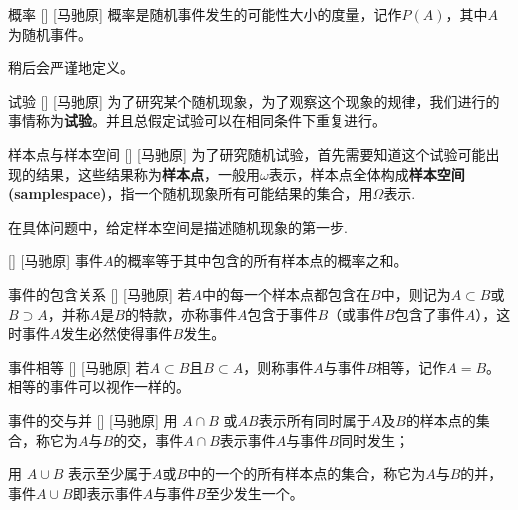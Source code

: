\documentclass[UTF8]{ctexart}
\begin{document}
        \begin{dfn}
            []
            {概率}
            []
            [马驰原]
            概率是随机事件发生的可能性大小的度量，记作$P(A)$，其中$A$为随机事件。
        \end{dfn}

        稍后会严谨地定义。

        \begin{dfn}
            []
            {试验}
            []
            [马驰原]
            为了研究某个随机现象，为了观察这个现象的规律，我们进行的事情称为\textbf{试验}。并且总假定试验可以在相同条件下重复进行。
        \end{dfn}

        \begin{dfn}
            []
            {样本点与样本空间}
            []
            [马驰原]
            为了研究随机试验，首先需要知道这个试验可能出现的结果，这些结果称为\textbf{样本点}，一般用$\omega$表示，样本点全体构成\textbf{样本空间(samplespace)}，指一个随机现象所有可能结果的集合，用$\Omega$表示.
        \end{dfn}

        在具体问题中，给定样本空间是描述随机现象的第一步.

        \begin{ppt}
            []
            {}
            []
            [马驰原]
            事件$A$的概率等于其中包含的所有样本点的概率之和。
        \end{ppt}

        \begin{dfn}
            []
            {事件的包含关系}
            []
            [马驰原]
            若$A$中的每一个样本点都包含在$B$中，则记为$A\subset B$或$B\supset  A$，并称$A$是$B$的特款，亦称事件$A$包含于事件$B$（或事件$B$包含了事件$A$），这时事件$A$发生必然使得事件$B$发生。
        \end{dfn}

        \begin{dfn}
            []
            {事件相等}
            []
            [马驰原]
            若$A\subset B$且$B\subset A$，则称事件$A$与事件$B$相等，记作$A=B$。相等的事件可以视作一样的。
        \end{dfn}

        \begin{dfn}
            []
            {事件的交与并}
            []
            [马驰原]
            用 $A\cap B$ 或$AB$表示所有同时属于$A$及$B$的样本点的集合，称它为$A$与$B$的交，事件$A\cap B$表示事件$A$与事件$B$同时发生；
    
            用 $A\cup B$ 表示至少属于$A$或$B$中的一个的所有样本点的集合，称它为$A$与$B$的并，事件$A\cup B$即表示事件$A$与事件$B$至少发生一个。
        \end{dfn}
\end{document}
